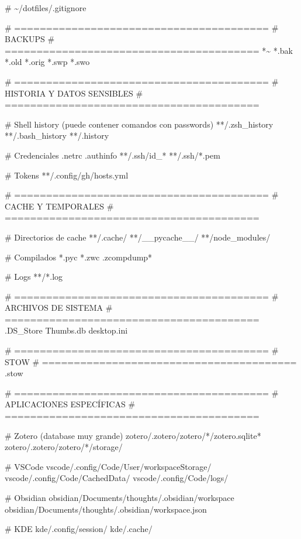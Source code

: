 \documentclass[
  doc,
  floatsintext,
  longtable,
  a4paper,
  nolmodern,
  notxfonts,
  notimes,
  12pt,
  colorlinks=true,linkcolor=blue,citecolor=blue,urlcolor=blue]{apa7}
\newenvironment{Shaded}{\begin{snugshade}}{\end{snugshade}}
\newcommand{\CommentTok}[1]{\textcolor[rgb]{0.37,0.37,0.37}{#1}}
\newcommand{\ExtensionTok}[1]{\textcolor[rgb]{0.00,0.23,0.31}{#1}}
\begin{document}
\begin{Shaded}
\begin{Highlighting}[]
\CommentTok{\# \textasciitilde{}/dotfiles/.gitignore}

\CommentTok{\# ========================================}
\CommentTok{\# BACKUPS}
\CommentTok{\# ========================================}
\ExtensionTok{*\textasciitilde{}}
\ExtensionTok{*.bak}
\ExtensionTok{*.old}
\ExtensionTok{*.orig}
\ExtensionTok{*.swp}
\ExtensionTok{*.swo}

\CommentTok{\# ========================================}
\CommentTok{\# HISTORIA Y DATOS SENSIBLES}
\CommentTok{\# ========================================}

\CommentTok{\# Shell history (puede contener comandos con passwords)}
\ExtensionTok{**/.zsh\_history}
\ExtensionTok{**/.bash\_history}
\ExtensionTok{**/.history}

\CommentTok{\# Credenciales}
\ExtensionTok{.netrc}
\ExtensionTok{.authinfo}
\ExtensionTok{**/.ssh/id\_*}
\ExtensionTok{**/.ssh/*.pem}

\CommentTok{\# Tokens}
\ExtensionTok{**/.config/gh/hosts.yml}

\CommentTok{\# ========================================}
\CommentTok{\# CACHE Y TEMPORALES}
\CommentTok{\# ========================================}

\CommentTok{\# Directorios de cache}
\ExtensionTok{**/.cache/}
\ExtensionTok{**/\_\_pycache\_\_/}
\ExtensionTok{**/node\_modules/}

\CommentTok{\# Compilados}
\ExtensionTok{*.pyc}
\ExtensionTok{*.zwc}
\ExtensionTok{.zcompdump*}

\CommentTok{\# Logs}
\ExtensionTok{**/*.log}

\CommentTok{\# ========================================}
\CommentTok{\# ARCHIVOS DE SISTEMA}
\CommentTok{\# ========================================}
\ExtensionTok{.DS\_Store}
\ExtensionTok{Thumbs.db}
\ExtensionTok{desktop.ini}

\CommentTok{\# ========================================}
\CommentTok{\# STOW}
\CommentTok{\# ========================================}
\ExtensionTok{.stow}

\CommentTok{\# ========================================}
\CommentTok{\# APLICACIONES ESPECÍFICAS}
\CommentTok{\# ========================================}

\CommentTok{\# Zotero (database muy grande)}
\ExtensionTok{zotero/.zotero/zotero/*/zotero.sqlite*}
\ExtensionTok{zotero/.zotero/zotero/*/storage/}

\CommentTok{\# VSCode}
\ExtensionTok{vscode/.config/Code/User/workspaceStorage/}
\ExtensionTok{vscode/.config/Code/CachedData/}
\ExtensionTok{vscode/.config/Code/logs/}

\CommentTok{\# Obsidian}
\ExtensionTok{obsidian/Documents/thoughts/.obsidian/workspace}
\ExtensionTok{obsidian/Documents/thoughts/.obsidian/workspace.json}

\CommentTok{\# KDE}
\ExtensionTok{kde/.config/session/}
\ExtensionTok{kde/.cache/}
\end{Highlighting}
\end{Shaded}
\end{document}
